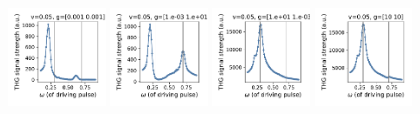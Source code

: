 \documentclass[a4paper]{article}
\begin{document}
\begin{figure}[H]
  \centering
  \includegraphics[width=0.23\textwidth]{driving-v1-case0.pdf}
  \includegraphics[width=0.23\textwidth]{driving-v1-case1.pdf}
  \includegraphics[width=0.23\textwidth]{driving-v1-case2.pdf}
  \includegraphics[width=0.23\textwidth]{driving-v1-case3.pdf}
\end{figure}
\end{document}
